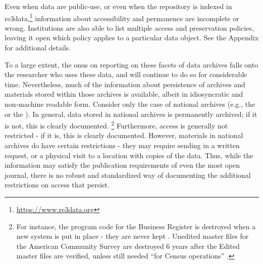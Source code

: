 Even when data are public-use, or even when the repository is indexed in re3data,\footnote{\url{https://www.re3data.org}} information about accessibility and permanence are incomplete or wrong. Institutions are also able to list multiple access and preservation policies, leaving it open which policy applies to a particular data object. See the Appendix for additional details.


To a large extent, the onus on reporting on these facets of data archives falls onto the researcher who uses these data, and will continue to do so for considerable time. 
%
Nevertheless, much of the information about persistence of archives and
materials stored within those archives is available, albeit in
idiosyncratic and non-machine readable form. Consider only the case of
national archives (e.g., the  or the ). 
In general, data stored in national archives is
permanently archived; if it is not, this is clearly documented.%
\footnote{For instance, the program code for the Business Register is destroyed when a new system is put in place - they are never kept \parencite{U.S.CensusBureau2009}. Unedited master files for the American Community Survey are destroyed 6 years after the Edited master files are verified, unless still needed ``for Census operations'' \parencite{U.S.CensusBureau1999}.}
Furthermore, access is generally not restricted - if it is, this is
clearly documented. However, materials in national archives do have
certain restrictions - they may require sending in a written request, or
a physical visit to a location with copies of the data. Thus, while the
information may satisfy the publication requirements of even the most
open journal, there is no robust and standardized way of documenting the
additional restrictions on access that persist. 

